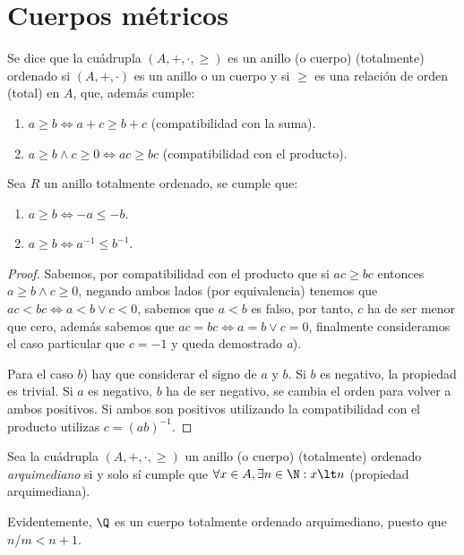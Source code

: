 \documentclass[11pt,oneside,a4paper]{book}
\begin{document}
\section{Cuerpos métricos}
\begin{mydef}
Se dice que la cuádrupla $(A,+,\cdot,\geq)$ es un anillo (o cuerpo) (totalmente) ordenado si $(A,+,\cdot)$ es un anillo o un cuerpo y si $\geq$ es una relación de orden (total) en $A$, que, además cumple:
\begin{enumerate}[$a$)]
\item $a\geq b\iff a+c\geq b+c$ (compatibilidad con la suma).
\item $a\geq b\wedge c\geq 0\iff ac\geq bc$ (compatibilidad con el producto).
\end{enumerate}
\end{mydef}
\begin{thm}
Sea $R$ un anillo totalmente ordenado, se cumple que:
\begin{enumerate}[$a$)]
\item $a\geq b\iff -a\leq -b$.
\item $a\geq b\iff a^{-1}\leq b^{-1}$.
\end{enumerate}
\end{thm}
\begin{proof}
Sabemos, por compatibilidad con el producto que si $ac\geq bc$ entonces $a\geq b\wedge c\geq 0$, negando ambos lados (por equivalencia) tenemos que $ac\lt bc\iff a\lt b\vee c\lt 0$, sabemos que $a\lt b$ es falso, por tanto, $c$ ha de ser menor que cero, además sabemos que $ac=bc\iff a=b\vee c=0$, finalmente consideramos el caso particular que $c=-1$ y queda demostrado \textit{a}).

Para el caso $b$) hay que considerar el signo de $a$ y $b$. Si $b$ es negativo, la propiedad es trivial. Si $a$ es negativo, $b$ ha de ser negativo, se cambia el orden para volver a ambos positivos. Si ambos son positivos utilizando la compatibilidad con el producto utilizas $c=(ab)^{-1}$.
\end{proof}
\begin{mydef}
Sea la cuádrupla $(A,+,\cdot,\geq)$ un anillo (o cuerpo) (totalmente) ordenado \textit{arquimediano} si y solo sí cumple que $\forall x\in A,\exists n\in\N:x\lt n$ (propiedad arquimediana).
\end{mydef}
Evidentemente, $\Q$ es un cuerpo totalmente ordenado arquimediano, puesto que $n/m\lt n+1$.
\end{document}
